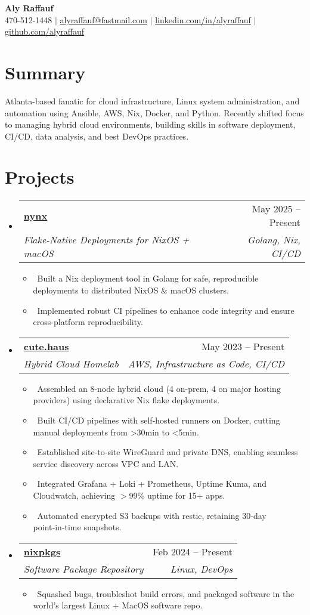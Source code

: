 \documentclass[letterpaper,11pt]{article}
\makeatletter
\newcommand{\resumeItem}[1]{
\item\small{#1}}
\newcommand{\resumeSubheading}[4]{
  \vspace{-1pt}
\item
  \begin{tabular*}{0.97\textwidth}[t]{l@{\extracolsep{\fill}}r}
    \textbf{#1} & #2 \\
    \textit{#3} & \textit{#4} \\
  \end{tabular*}\vspace{-7pt}
}
\newcommand{\resumeSubHeadingList}{
\begin{itemize}[leftmargin=0.15in, label={}]}
\newcommand{\resumeSubHeadingListEnd}{
  \end{itemize}}
\makeatother
\begin{document}
\begin{center}
  \textbf{\Huge Aly Raffauf} \\
  \small 470-512-1448 $|$
  \href{mailto:alyraffauf@fastmail.com}{alyraffauf@fastmail.com} $|$
  \href{https://linkedin.com/in/alyraffauf}{linkedin.com/in/alyraffauf} $|$
  \href{https://github.com/alyraffauf}{github.com/alyraffauf}
\end{center}

\section{Summary}
Atlanta-based fanatic for cloud infrastructure, Linux system
administration, and automation using Ansible, AWS, Nix, Docker, and
Python. Recently shifted focus to managing hybrid cloud environments,
building skills in software deployment, CI/CD, data analysis, and
best DevOps practices.

\section{Projects}
\resumeSubHeadingList
\resumeSubheading
{\href{https://github.com/alyraffauf/nynx}{nynx}}{May 2025 -- Present}
{Flake-Native Deployments for NixOS + macOS}{Golang, Nix, CI/CD}
\resumeSubHeadingList
\resumeItem{\textbullet\ Built a Nix deployment tool in Golang for
safe, reproducible deployments to distributed NixOS \& macOS clusters.}
\resumeItem{\textbullet\ Implemented robust CI pipelines to enhance
code integrity and ensure cross-platform reproducibility.}
\resumeSubHeadingListEnd
\resumeSubheading
{\href{https://cute.haus}{cute.haus}}{May 2023 -- Present}
{Hybrid Cloud Homelab}{AWS, Infrastructure as Code, CI/CD}
\resumeSubHeadingList
\resumeItem{\textbullet\ Assembled an 8-node hybrid
  cloud (4 on-prem, 4 on major hosting providers) using declarative Nix
flake deployments.}
\resumeItem{\textbullet\ Built CI/CD pipelines with
self-hosted runners on Docker, cutting manual deployments from >30min to <5min.}
\resumeItem{\textbullet\ Established site‑to‑site WireGuard and
private DNS, enabling seamless service discovery across VPC and LAN.}
\resumeItem{\textbullet\ Integrated Grafana + Loki + Prometheus, Uptime
Kuma, and Cloudwatch, achieving $>$99\% uptime for 15+ apps.}
\resumeItem{\textbullet\ Automated encrypted S3 backups
with restic, retaining 30‑day point‑in‑time snapshots.}
\resumeSubHeadingListEnd
\resumeSubheading
{\href{https://github.com/NixOS/nixpkgs}{nixpkgs}}{Feb 2024 -- Present}
{Software Package Repository}{Linux, DevOps}
\resumeSubHeadingList
\resumeItem{\textbullet\ Squashed bugs, troubleshot build errors, and
packaged software in the world's largest Linux + MacOS software repo.}
\resumeSubHeadingListEnd
\resumeSubHeadingListEnd
\end{document}
